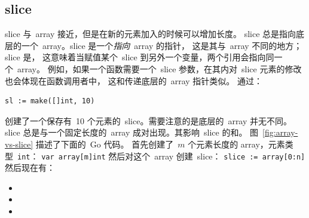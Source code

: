 \subsection{slice}
\label{sec:slices}
slice 与~array 接近，但是在新的元素加入的时候可以增加长度。
slice 总是指向底层的一个~array。slice 是一个\emph{指向}~array 的指针，
这是其与~array 不同的地方；
slice 是，
这意味着当赋值某个~slice 到另外一个变量，两个引用会指向同一个~array。
例如，如果一个函数需要一个~slice 参数，在其内对~slice 元素的修改也会体现在函数调用者中，
这和传递底层的~array 指针类似。
通过：
\begin{lstlisting}
sl := make([]int, 10)
\end{lstlisting}
创建了一个保存有~10 个元素的~slice。需要注意的是底层的~array 并无不同。
slice 总是与一个固定长度的~array 成对出现。其影响~slice 
的和。
图~\ref{fig:array-vs-slice} 描述了下面的~Go 代码。
首先创建了~$m$ 个元素长度的 array，元素类型~\lstinline{int}：
\lstinline{var array[m]int}\newline
然后对这个~array 创建~slice：
\lstinline{slice := array[0:n]}\newline
然后现在有：
\begin{itemize}
    \item[\lstinline{len(slice) == n}{} ;]
    \item[\lstinline{cap(slice) == m}{} ;]
    \item[\lstinline{len(array) == cap(array) == m}{} .]
\end{itemize}
